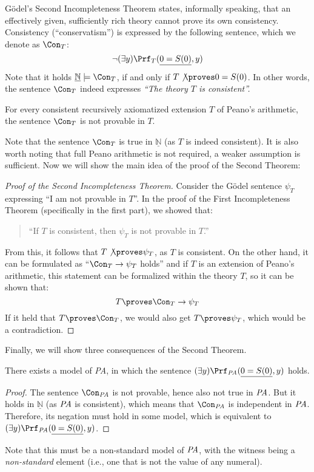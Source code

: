     Gödel's Second Incompleteness Theorem states, informally speaking, that an effectively given, sufficiently rich theory cannot prove its own consistency. Consistency (``conservatism'') is expressed by the following sentence, which we denote as $\Con_T$:
    $$
    \neg(\exists y)\Prf_T(\underline{0=S(0)},y)
    $$
    Note that it holds $\underline{\mathbb N}\models\Con_T$, if and only if $T\not\proves 0=S(0)$. In other words, the sentence $\Con_T$ indeed expresses \emph{``The theory $T$ is consistent''.}
    
    \begin{theorem}
    For every consistent recursively axiomatized extension $T$ of Peano's arithmetic, the sentence $\Con_T$ is not provable in $T$.    
    \end{theorem}
    
    Note that the sentence $\Con_T$ is true in $\underline{\mathbb N}$ (as $T$ is indeed consistent). It is also worth noting that full Peano arithmetic is not required, a weaker assumption is sufficient. Now we will show the main idea of the proof of the Second Theorem:
    
    \begin{proof}[Proof of the Second Incompleteness Theorem]
    Consider the Gödel sentence $\psi_T$ expressing ``I am not provable in $T$''. In the proof of the First Incompleteness Theorem (specifically in the first part), we showed that:
    \begin{quote}
        ``If $T$ is consistent, then $\psi_T$ is not provable in $T$.''
    \end{quote}
    From this, it follows that $T\not\proves\psi_T$, as $T$ is consistent. On the other hand, it can be formulated as ``$\Con_T\to \psi_T$ holds'' and if $T$ is an extension of Peano's arithmetic, this statement can be formalized within the theory $T$, so it can be shown that:
    $$
    T\proves\Con_T\to\psi_T
    $$
    If it held that $T\proves\Con_T$, we would also get $T\proves\psi_T$, which would be a contradiction.
    \end{proof}
    
    Finally, we will show three consequences of the Second Theorem.
    
    \begin{corollary}
        There exists a model of {\it PA}, in which the sentence $(\exists y)\Prf_{\text{\it PA}}(\underline{0=S(0)},y)$ holds.
    \end{corollary}
    \begin{proof}
        The sentence $\Con_{\text{\it PA}}$ is not provable, hence also not true in $\text{\it PA}$. But it holds in $\underline{\mathbb N}$ (as $\text{\it PA}$ is consistent), which means that $\Con_{\text{\it PA}}$ is independent in $\text{\it PA}$. Therefore, its negation must hold in some model, which is equivalent to $(\exists y)\Prf_{\text{\it PA}}(\underline{0=S(0)},y)$.
            
    \end{proof}
    Note that this must be a non-standard model of $\text{\it PA}$, with the witness being a \emph{non-standard} element (i.e., one that is not the value of any numeral).
    
